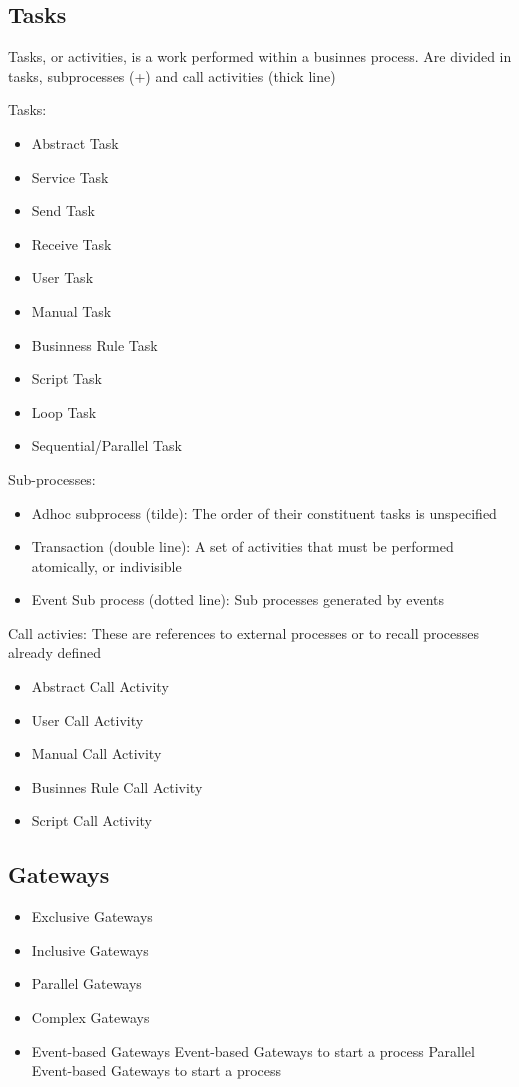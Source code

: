 \documentclass[12pt, a4paper]{article}
\begin{document}
\subsection{Tasks}
Tasks, or activities, is a work performed within a businnes process. Are divided in tasks, subprocesses (+)
and call activities (thick line)

Tasks:
\begin{itemize}
    \item Abstract Task 
    \item Service Task 
    \item Send Task 
    \item Receive Task 
    \item User Task 
    \item Manual Task 
    \item Businness Rule Task
    \item Script Task 
    \item Loop Task 
    \item Sequential/Parallel Task
\end{itemize}

Sub-processes:
\begin{itemize}
    \item Adhoc subprocess (tilde): The order of their constituent tasks is unspecified
    \item Transaction (double line): A set of activities that must be performed atomically, or indivisible
    \item Event Sub process (dotted line): Sub processes generated by events
\end{itemize}

Call activies:
These are references to external processes or to recall processes already defined

\begin{itemize}
    \item Abstract Call Activity
    \item User Call Activity
    \item Manual Call Activity
    \item Businnes Rule Call Activity
    \item Script Call Activity
\end{itemize}

\subsection{Gateways}

\begin{itemize}
    \item Exclusive Gateways
    \item Inclusive Gateways
    \item Parallel Gateways
    \item Complex Gateways
    \item Event-based Gateways
    \subitem Event-based Gateways to start a process
    \subitem Parallel Event-based Gateways to start a process
\end{itemize}
\end{document}
